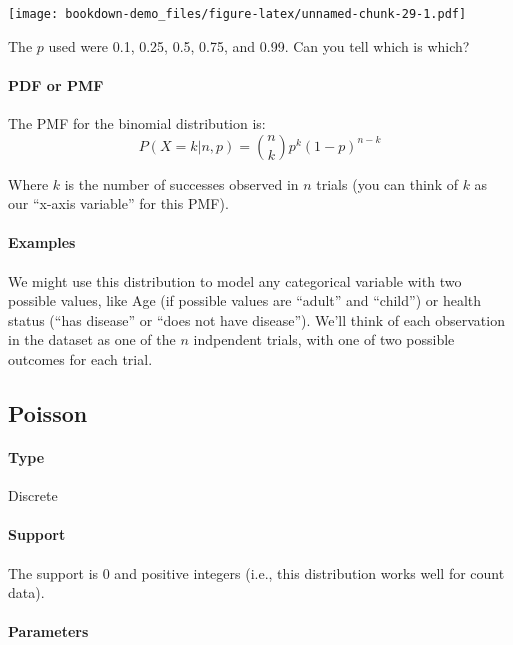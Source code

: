 \documentclass[]{book}
\let\oldparagraph\paragraph
\renewcommand{\paragraph}[1]{\oldparagraph{#1}\mbox{}}
\begin{document}
\texttt{[image: bookdown-demo\_files/figure-latex/unnamed-chunk-29-1.pdf]}

The \(p\) used were 0.1, 0.25, 0.5, 0.75, and 0.99. Can you tell which is which?

\hypertarget{pdf-or-pmf-3}{%
\paragraph{PDF or PMF}\label{pdf-or-pmf-3}}

The PMF for the binomial distribution is:
\[ P(X=k \vert n,p) = {n \choose k} p^k (1-p)^{n-k}\]

Where \(k\) is the number of successes observed in \(n\) trials (you can think of \(k\) as our ``x-axis variable'' for this PMF).

\hypertarget{examples-3}{%
\paragraph{Examples}\label{examples-3}}

We might use this distribution to model any categorical variable with two possible values, like Age (if possible values are ``adult'' and ``child'') or health status (``has disease'' or ``does not have disease''). We'll think of each observation in the dataset as one of the \(n\) indpendent trials, with one of two possible outcomes for each trial.

\hypertarget{poisson}{%
\subsection{Poisson}\label{poisson}}

\hypertarget{type-4}{%
\paragraph{Type}\label{type-4}}

Discrete

\hypertarget{support-4}{%
\paragraph{Support}\label{support-4}}

The support is 0 and positive integers (i.e., this distribution works well for count data).

\hypertarget{parameters-4}{%
\paragraph{Parameters}\label{parameters-4}}
\end{document}
